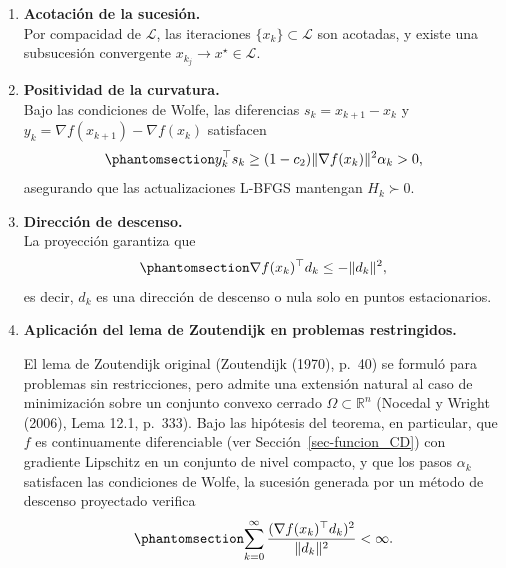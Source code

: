 \documentclass[
  spanish,
  us-letterpaper,
]{scrreprt}
\numberwithin{equation}{section}
\begin{document}
\begin{enumerate}
\def\labelenumi{\arabic{enumi}.}
\item
  \textbf{Acotación de la sucesión.}\\
  Por compacidad de \(\mathcal{L}\), las iteraciones
  \(\{x_k\} \subset \mathcal{L}\) son acotadas, y existe una subsucesión
  convergente \(x_{k_j} \to x^\star \in \mathcal{L}\).
\item
  \textbf{Positividad de la curvatura.}\\
  Bajo las condiciones de Wolfe, las diferencias \(s_k = x_{k+1} - x_k\)
  y \(y_k = \nabla f(x_{k+1}) - \nabla f(x_k)\) satisfacen
  \begin{equation}\phantomsection\label{eq-67}{
  y_k^\top s_k \ge (1 - c_2)\|\nabla f(x_k)\|^2 \alpha_k > 0, 
  }\end{equation} asegurando que las actualizaciones L-BFGS mantengan
  \(H_k \succ 0\).
\item
  \textbf{Dirección de descenso.}\\
  La proyección garantiza que
  \begin{equation}\phantomsection\label{eq-68}{
  \nabla f(x_k)^\top d_k \le -\|d_k\|^2, 
  }\end{equation} es decir, \(d_k\) es una dirección de descenso o nula
  solo en puntos estacionarios.
\item
  \textbf{Aplicación del lema de Zoutendijk en problemas restringidos.}

  El lema de Zoutendijk original (Zoutendijk (1970), p.~40) se formuló
  para problemas sin restricciones, pero admite una extensión natural al
  caso de minimización sobre un conjunto convexo cerrado
  \(\Omega \subset \mathbb{R}^n\) (Nocedal y Wright (2006), Lema 12.1,
  p.~333). Bajo las hipótesis del teorema, en particular, que \(f\) es
  continuamente diferenciable (ver Sección~\ref{sec-funcion_CD}) con
  gradiente Lipschitz en un conjunto de nivel compacto, y que los pasos
  \(\alpha_k\) satisfacen las condiciones de Wolfe, la sucesión generada
  por un método de descenso proyectado verifica
  \begin{equation}\phantomsection\label{eq-wol}{
  \sum_{k=0}^\infty \frac{(\nabla f(x_k)^\top d_k)^2}{\|d_k\|^2} < \infty. 
  }\end{equation}


\end{enumerate}
\end{document}
